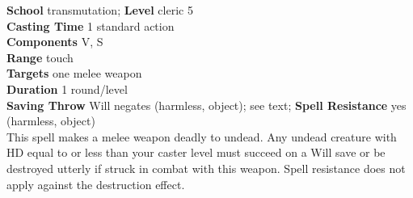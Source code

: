 \textbf{School} transmutation; \textbf{Level} cleric 5\\
\textbf{Casting Time} 1 standard action\\
\textbf{Components} V, S\\
\textbf{Range} touch\\
\textbf{Targets} one melee weapon\\
\textbf{Duration} 1 round/level\\
\textbf{Saving Throw }Will negates (harmless, object); see text; \textbf{Spell Resistance} yes (harmless, object)\\
This spell makes a melee weapon deadly to undead. Any undead creature with HD equal to or less than your caster level must succeed on a Will save or be destroyed utterly if struck in combat with this weapon. Spell resistance does not apply against the destruction effect.\\
